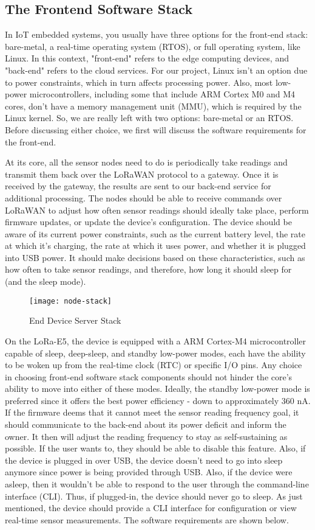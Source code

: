 \subsection{The Frontend Software Stack}
In IoT embedded systems, you usually have three options for the front-end stack:
bare-metal, a real-time operating system (RTOS), or full operating system, like
Linux. In this context, "front-end" refers to the edge computing devices, and
"back-end" refers to the cloud services. For our project, Linux isn't an option
due to power constraints, which in turn affects processing power. Also, most
low-power microcontrollers, including some that include ARM Cortex M0 and M4
cores, don't have a memory management unit (MMU), which is required by the Linux
kernel. So, we are really left with two options: bare-metal or an RTOS. Before
discussing either choice, we first will discuss the software requirements for
the front-end. 

At its core, all the sensor nodes need to do is periodically take readings and
transmit them back over the LoRaWAN protocol to a gateway. Once it is received
by the gateway, the results are sent to our back-end service for additional
processing. The nodes should be able to receive commands over LoRaWAN to adjust
how often sensor readings should ideally take place, perform firmware updates,
or update the device's configuration. The device should be aware of its current
power constraints, such as the current battery level, the rate at which it's
charging, the rate at which it uses power, and whether it is plugged into USB
power. It should make decisions based on these characteristics, such as how
often to take sensor readings, and therefore, how long it should sleep for (and
the sleep mode).

\begin{figure}
  \centering
  \texttt{[image: node-stack]}
  \caption{End Device Server Stack}
  \label{node-stack}
\end{figure}

On the LoRa-E5, the device is equipped with a ARM Cortex-M4
microcontroller capable of sleep, deep-sleep, and standby low-power modes, each
have the ability to be woken up from the real-time clock (RTC) or specific I/O
pins. Any choice in choosing front-end software stack components should not
hinder the core's ability to move into either of these modes. Ideally, the
standby low-power mode is preferred since it offers the best power efficiency -
down to approximately 360 nA. If the firmware deems that it cannot meet the
sensor reading frequency goal, it should communicate to the back-end about its
power deficit and inform the owner. It then will adjust the reading frequency to
stay as self-sustaining as possible. If the user wants to, they should be able
to disable this feature. Also, if the device is plugged in over USB, the device
doesn't need to go into sleep anymore since power is being provided through USB.
Also, if the device were asleep, then it wouldn't be able to respond to the user
through the command-line interface (CLI). Thus, if plugged-in, the device should
never go to sleep. As just mentioned, the device should provide a CLI interface
for configuration or view real-time sensor measurements. The software
requirements are shown below.


